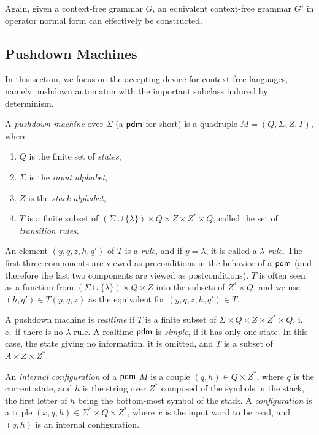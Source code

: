 Again, given a context-free grammar $G$, an equivalent context-free grammar $G'$ in operator normal form can effectively be constructed.

\subsection{Pushdown Machines}
\label{subsection:pushdown-machines}

In this section, we focus on the accepting device for context-free languages, namely pushdown automaton with the important subclass induced by determinism.

A \emph{pushdown machine} over $\Sigma$ (a \index{$\pdm$}$\pdm$ for short) is a quadruple $M = (Q, \Sigma, Z, T)$, where

\begin{enumerate}[]
\item $Q$ is the finite set of \emph{states},
\item $\Sigma$ is the \emph{input alphabet},
\item $Z$ is the \emph{stack alphabet},
\item $T$ is a finite subset of $(\Sigma \cup \{\lambda\}) \times Q \times Z \times Z^* \times Q$, called the set of \emph{transition rules}.
\end{enumerate}

An element $(y, q, z, h, q')$ of $T$ is a \emph{rule}, and if $y = \lambda$, it is called a \emph{$\lambda$-rule}. The first three components are viewed as preconditions in the behavior of a \index{$\pdm$}$\pdm$ (and therefore the last two components are viewed as postconditions). $T$ is often seen as a function from $(\Sigma \cup \{\lambda\}) \times Q \times Z$ into the subsets of $Z^* \times Q$, and we use $(h, q') \in T(y, q, z)$ as the equivalent for $(y, q, z, h, q') \in T$.

A pushdown machine is \emph{realtime} if $T$ is a finite subset of $\Sigma \times Q \times Z \times Z^* \times Q$, i.\,e.\ if there is no $\lambda$-rule. A realtime \index{$\pdm$}$\pdm$ is \emph{simple}, if it has only one state. In this case, the state giving no information, it is omitted, and $T$ is a subset of $A \times Z \times Z^*$.

An \emph{internal configuration} of a \index{$\pdm$}$\pdm$ $M$ is a couple $(q, h) \in Q \times Z^*$, where $q$ is the current state, and $h$ is the string over $Z^*$ composed of the symbols in the stack, the first letter of $h$ being the bottom-most symbol of the stack. A \emph{configuration} is a triple $(x, q, h) \in \Sigma^* \times Q \times Z^*$, where $x$ is the input word to be read, and $(q, h)$ is an internal configuration.

